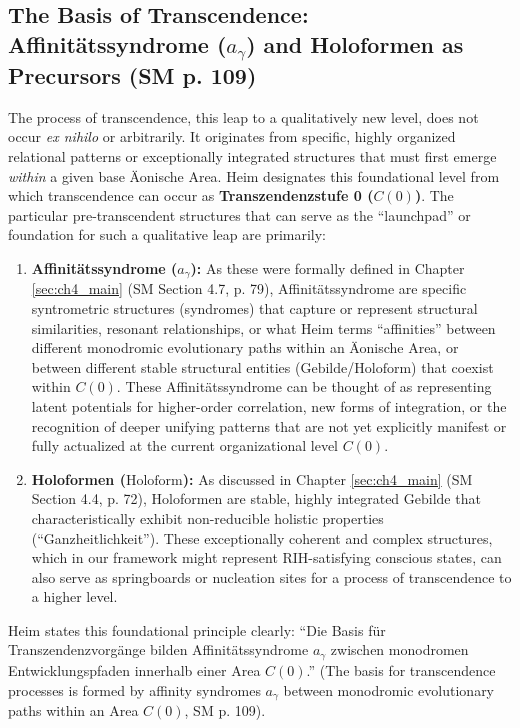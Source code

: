 \documentclass[
    12pt,              %
    a4paper,           %
    headings=normal,   %
    twoside=true,      %
    BCOR=8mm,          %
]{scrbook}
\newcommand{\q}[1]{\enquote{#1}}
\newcommand{\conceptualsyndrome}{a}
\newcommand{\syntrometrischesGebilde}{\text{Gebilde}}
\newcommand{\holoform}{\text{Holoform}}
\newcommand{\transzendenzstufe}[1]{C(#1)}
\begin{document}
\subsection{The Basis of Transcendence: Affinitätssyndrome (\(\conceptualsyndrome_\gamma\)) and Holoformen as Precursors (SM p. 109)}
\label{sec:ch6_basis_transcendence}
The process of transcendence, this leap to a qualitatively new level, does not occur \textit{ex nihilo} or arbitrarily. It originates from specific, highly organized relational patterns or exceptionally integrated structures that must first emerge \textit{within} a given base Äonische Area. Heim designates this foundational level from which transcendence can occur as \textbf{Transzendenzstufe 0 (\(\transzendenzstufe{0}\))}. The particular pre-transcendent structures that can serve as the \q{launchpad} or foundation for such a qualitative leap are primarily:
\begin{enumerate}
    \item  \textbf{Affinitätssyndrome (\(\conceptualsyndrome_\gamma\)):} As these were formally defined in Chapter \ref{sec:ch4_main} (SM Section 4.7, p. 79), Affinitätssyndrome are specific syntrometric structures (syndromes) that capture or represent structural similarities, resonant relationships, or what Heim terms \q{affinities} between different monodromic evolutionary paths within an Äonische Area, or between different stable structural entities (\(\syntrometrischesGebilde\)/\(\holoform\)) that coexist within \(\transzendenzstufe{0}\). These Affinitätssyndrome can be thought of as representing latent potentials for higher-order correlation, new forms of integration, or the recognition of deeper unifying patterns that are not yet explicitly manifest or fully actualized at the current organizational level \(\transzendenzstufe{0}\).
    \item  \textbf{Holoformen (\(\holoform\)):} As discussed in Chapter \ref{sec:ch4_main} (SM Section 4.4, p. 72), Holoformen are stable, highly integrated \(\syntrometrischesGebilde\) that characteristically exhibit non-reducible holistic properties (\q{Ganzheitlichkeit}). These exceptionally coherent and complex structures, which in our framework might represent RIH-satisfying conscious states, can also serve as springboards or nucleation sites for a process of transcendence to a higher level.
\end{enumerate}
Heim states this foundational principle clearly: \q{Die Basis für Transzendenzvorgänge bilden Affinitätssyndrome \( \conceptualsyndrome_\gamma \) zwischen monodromen Entwicklungspfaden innerhalb einer Area \( \transzendenzstufe{0} \).} (The basis for transcendence processes is formed by affinity syndromes \( \conceptualsyndrome_\gamma \) between monodromic evolutionary paths within an Area \( \transzendenzstufe{0} \), SM p. 109).
\end{document}
